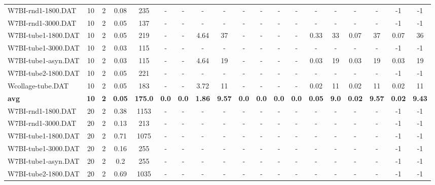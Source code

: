 \begin{sidewaystable}[!ht]
{\begin{tabular}{lcccccccccccccccccc}
W7BI-rnd1-1800.DAT & 10 & 2 &  \textcolor{blue2}{0.08} & 235 &  - &  - &  - &  - &  - &  - &  - &  - &  - &  - &  - &  - & -1 & -1 \\
W7BI-rnd1-3000.DAT & 10 & 2 &  \textcolor{blue2}{0.05} & 137 &  - &  - &  - &  - &  - &  - &  - &  - &  - &  - &  - &  - & -1 & -1 \\
W7BI-tube1-1800.DAT & 10 & 2 &  \textcolor{blue2}{0.05} & 219 &  - &  - & 4.64 & 37 &  - &  - &  - &  - & 0.33 & 33 & 0.07 & 37 & 0.07 & 36 \\
W7BI-tube1-3000.DAT & 10 & 2 &  \textcolor{blue2}{0.03} & 115 &  - &  - &  - &  - &  - &  - &  - &  - &  - &  - &  - &  - & -1 & -1 \\
W7BI-tube1-asyn.DAT & 10 & 2 &  \textcolor{blue2}{0.03} & 115 &  - &  - & 4.64 & 19 &  - &  - &  - &  - &  \textcolor{blue2}{0.03} & 19 &  \textcolor{blue2}{0.03} & 19 &  \textcolor{blue2}{0.03} & 19 \\
W7BI-tube2-1800.DAT & 10 & 2 &  \textcolor{blue2}{0.05} & 221 &  - &  - &  - &  - &  - &  - &  - &  - &  - &  - &  - &  - & -1 & -1 \\
Wcollage-tube.DAT & 10 & 2 & 0.05 & 183 &  - &  - & 3.72 & 11 &  - &  - &  - &  - &  \textcolor{blue2}{0.02} & 11 &  \textcolor{blue2}{0.02} & 11 &  \textcolor{blue2}{0.02} & 11 \\
\cline{1-19} \textbf{avg} & \textbf{10} & \textbf{2} & \textbf{0.05} & \textbf{175.0} & \textbf{0.0} & \textbf{0.0} & \textbf{1.86} & \textbf{9.57} & \textbf{0.0} & \textbf{0.0} & \textbf{0.0} & \textbf{0.0} & \textbf{0.05} & \textbf{9.0} & \textbf{0.02} & \textbf{9.57} & \textbf{0.02} & \textbf{9.43} \\ \cline{1-19}
W7BI-rnd1-1800.DAT & 20 & 2 &  \textcolor{blue2}{0.38} & 1153 &  - &  - &  - &  - &  - &  - &  - &  - &  - &  - &  - &  - & -1 & -1 \\
W7BI-rnd1-3000.DAT & 20 & 2 &  \textcolor{blue2}{0.13} & 213 &  - &  - &  - &  - &  - &  - &  - &  - &  - &  - &  - &  - & -1 & -1 \\
W7BI-tube1-1800.DAT & 20 & 2 &  \textcolor{blue2}{0.71} & 1075 &  - &  - &  - &  - &  - &  - &  - &  - &  - &  - &  - &  - & -1 & -1 \\
W7BI-tube1-3000.DAT & 20 & 2 &  \textcolor{blue2}{0.16} & 255 &  - &  - &  - &  - &  - &  - &  - &  - &  - &  - &  - &  - & -1 & -1 \\
W7BI-tube1-asyn.DAT & 20 & 2 &  \textcolor{blue2}{0.2} & 255 &  - &  - &  - &  - &  - &  - &  - &  - &  - &  - &  - &  - & -1 & -1 \\
W7BI-tube2-1800.DAT & 20 & 2 &  \textcolor{blue2}{0.69} & 1035 &  - &  - &  - &  - &  - &  - &  - &  - &  - &  - &  - &  - & -1 & -1 \\

\end{tabular}}
\end{sidewaystable}
